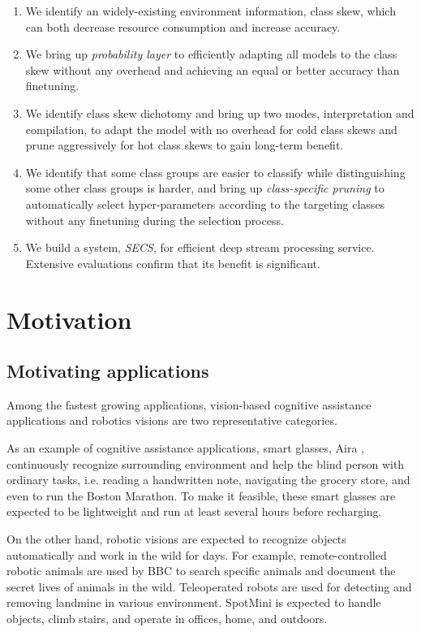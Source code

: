 \documentclass[pageno]{jpaper}
\begin{document}
\begin{enumerate}
  \item We identify an widely-existing environment information, class skew, which can both decrease resource consumption and increase accuracy.
  \item We bring up \textit{probability layer} to efficiently adapting all models to the class skew without any overhead and achieving an equal or better accuracy than finetuning.
  \item We identify class skew dichotomy and bring up two modes, interpretation and compilation, to adapt the model with no overhead for cold class skews and prune aggressively for hot class skews to gain long-term benefit.
  \item We identify that some class groups are easier to classify while distinguishing some other class groups is harder, and bring up \textit{class-specific pruning} to automatically select hyper-parameters according to the targeting classes without any finetuning during the selection process.
  \item We build a system, \textit{SECS}, for efficient deep stream processing service. Extensive evaluations confirm that its benefit is significant.
\end{enumerate}




\section{Motivation} \label{Motivation}
\subsection{Motivating applications}
Among the fastest growing applications, vision-based cognitive assistance applications and robotics visions are two representative categories.

As an example of cognitive assistance applications, smart glasses, Aira \cite{aria2018}, continuously recognize surrounding environment and help the blind person with ordinary tasks, i.e. reading a handwritten note, navigating the grocery store, and even to run the Boston Marathon. To make it feasible, these smart glasses are expected to be lightweight and run at least several hours before recharging. 

On the other hand, robotic visions are expected to recognize objects automatically and work in the wild for days. For example, remote-controlled robotic animals are used by BBC \cite{bbc2018} to search specific animals and document the secret lives of animals in the wild. Teleoperated robots \cite{landmine2018} are used for detecting and removing landmine in various environment. SpotMini \cite{spot-mini} is expected to handle objects, climb stairs, and operate in offices, home, and outdoors.
\end{document}
